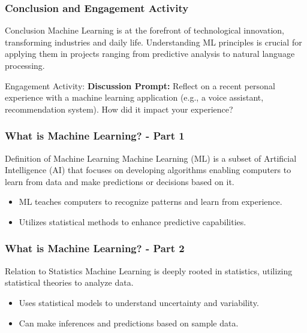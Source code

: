\documentclass[aspectratio=169]{beamer}
\begin{document}
\begin{frame}[fragile]
    \frametitle{Conclusion and Engagement Activity}
    \begin{block}{Conclusion}
        Machine Learning is at the forefront of technological innovation, transforming industries and daily life. 
        Understanding ML principles is crucial for applying them in projects ranging from predictive analysis to natural language processing.
    \end{block}

    \begin{block}{Engagement Activity:}
        \textbf{Discussion Prompt:} Reflect on a recent personal experience with a machine learning application (e.g., a voice assistant, recommendation system). 
        How did it impact your experience?
    \end{block}
\end{frame}

\begin{frame}[fragile]
    \frametitle{What is Machine Learning? - Part 1}
    \begin{block}{Definition of Machine Learning}
        Machine Learning (ML) is a subset of Artificial Intelligence (AI) that focuses on developing algorithms enabling computers to learn from data and make predictions or decisions based on it. 
    \end{block}
    \begin{itemize}
        \item ML teaches computers to recognize patterns and learn from experience.
        \item Utilizes statistical methods to enhance predictive capabilities.
    \end{itemize}
\end{frame}

\begin{frame}[fragile]
    \frametitle{What is Machine Learning? - Part 2}
    \begin{block}{Relation to Statistics}
        Machine Learning is deeply rooted in statistics, utilizing statistical theories to analyze data.
    \end{block}
    \begin{itemize}
        \item Uses statistical models to understand uncertainty and variability.
        \item Can make inferences and predictions based on sample data.
    \end{itemize}
\end{frame}
\end{document}
